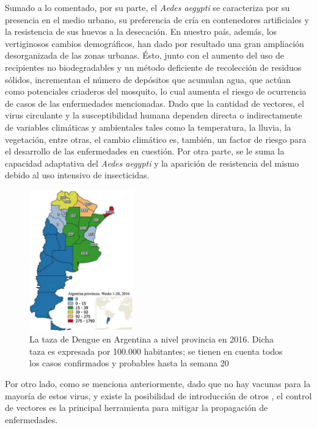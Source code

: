   \par Sumado a lo comentado, por su parte, el \textit{Aedes aegypti} se
    caracteriza por su presencia en el medio urbano, su preferencia
    de cría en contenedores artificiales \cite{cont_artificiales} y la
    resistencia de sus huevos a la
    desecación. En nuestro país, además, los vertiginosos cambios demográficos, han dado
    por resultado una gran ampliación desorganizada de las zonas urbanas. Ésto, junto
    con el aumento del uso de recipientes no biodegradables y un método deficiente
    de recolección de residuos sólidos, incrementan el número de depósitos que
    acumulan agua, que actúan como potenciales criaderos del mosquito, lo cual aumenta el
    riesgo de ocurrencia de casos de las enfermedades mencionadas.
    Dado que la cantidad de vectores, el virus circulante y la susceptibilidad
    humana dependen directa o indirectamente de variables climáticas y ambientales
    tales como la temperatura, la lluvia, la vegetación, entre otras,
    el cambio climático es, también, un factor de riesgo para el desarrollo
    de las enfermedades en cuestión. Por otra parte, se le suma la capacidad adaptativa del
    \textit{Aedes aegypti} y la aparición de resistencia del mismo debido al uso intensivo de
    insecticidas.

    \begin{figure}
    \centering%
    \includegraphics[width=0.4\textwidth]{images/dengue}%
    \caption{La taza de Dengue en Argentina a nivel provincia en 2016.
            Dicha taza es expresada por 100.000 habitantes; se tienen en cuenta
            todos los casos confirmados y probables hasta la semana 20}\label{fig:dengue}
    \end{figure}

  \par Por otro lado, como se menciona anteriormente, dado que no hay vacunas para la
    mayoría de estos virus, y existe la posibilidad de introducción de otros \cite{emergencia_viral},
    el control de vectores es la principal herramienta para mitigar la
    propagación de enfermedades.


